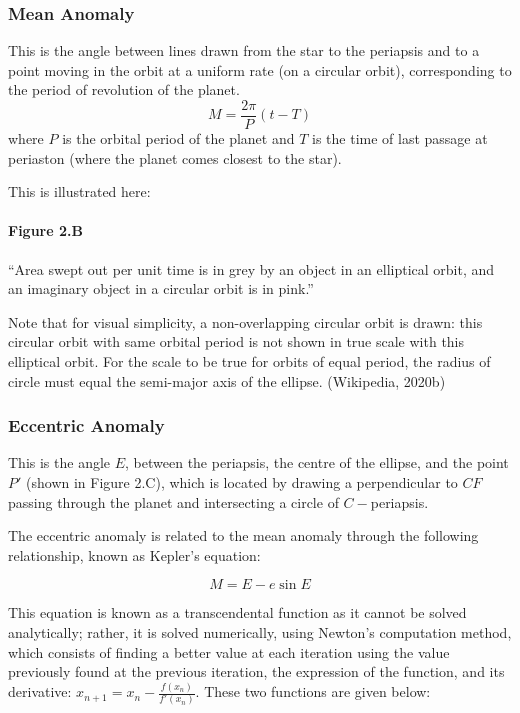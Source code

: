 \documentclass[11pt]{article}
\begin{document}
\hypertarget{mean-anomaly}{%
\subsubsection{Mean Anomaly}\label{mean-anomaly}}

This is the angle between lines drawn from the star to the periapsis and
to a point moving in the orbit at a uniform rate (on a circular orbit),
corresponding to the period of revolution of the planet.
\begin{equation*}
M = \frac{2\pi}{P}(t-T) 
\end{equation*} where \(P\) is the orbital period of the planet and
\(T\) is the time of last passage at periaston (where the planet comes
closest to the star).

This is illustrated here:

    \hypertarget{figure-2.b}{%
\paragraph{Figure 2.B}\label{figure-2.b}}

``Area swept out per unit time is in grey by an object in an elliptical
orbit, and an imaginary object in a circular orbit is in pink.''

Note that for visual simplicity, a non-overlapping circular orbit is
drawn: this circular orbit with same orbital period is not shown in true
scale with this elliptical orbit. For the scale to be true for orbits of
equal period, the radius of circle must equal the semi-major axis of the
ellipse. (Wikipedia, 2020b)

    \hypertarget{eccentric-anomaly}{%
\subsubsection{Eccentric Anomaly}\label{eccentric-anomaly}}

This is the angle \(E\), between the periapsis, the centre of the
ellipse, and the point $P'$ (shown in Figure 2.C), which is located by
drawing a perpendicular to \(CF\) passing through the planet and
intersecting a circle of \(C-\)periapsis.

The eccentric anomaly is related to the mean anomaly through the
following relationship, known as Kepler's equation:

\begin{equation*}
M = E - e\sin{E} 
\end{equation*}

This equation is known as a transcendental function as it cannot be
solved analytically; rather, it is solved numerically, using Newton's
computation method, which consists of finding a better value at each
iteration using the value previously found at the previous iteration,
the expression of the function, and its derivative:
\(x_{n+1} = x_{n}-\frac{f(x_{n})}{f'(x_{n})}\). These two functions are
given below:
\end{document}
